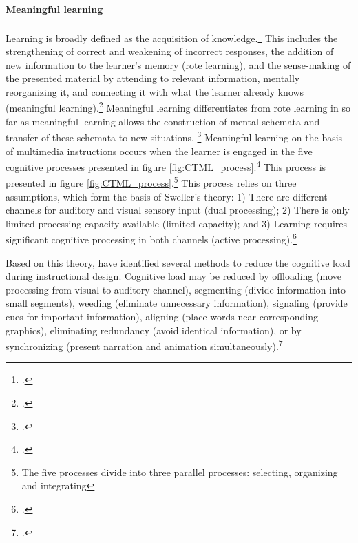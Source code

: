 \paragraph{Meaningful learning} Learning is broadly defined as the acquisition of knowledge.\footcites[Cf.][p.226]{MayerRotemeaningfullearning2002} This includes the strengthening of correct and weakening of incorrect responses, the addition of new information to the learner's memory (rote learning), and the sense-making of the presented material by attending to relevant information, mentally reorganizing it, and connecting it with what the learner already knows (meaningful learning).\footcites[Cf.][chapter 2, paragraph 5]{ClarkElearningscienceinstruction2016} Meaningful learning differentiates from rote learning in so far as meaningful learning allows the construction of mental schemata and transfer of these schemata to new situations.%
\footcites[Cf.][p.227]{MayerRotemeaningfullearning2002}[cf.][p.299]{SwellerCognitiveloadtheory1994} Meaningful learning on the basis of multimedia instructions occurs when the learner is engaged in the five cognitive processes presented in figure \ref{fig:CTML_process}.\footcites[Cf.][p.111]{MayerCognitiveTheoryMultimedia1999}[cf.][p.35]{SordenCognitiveTheoryMultimedia2012}[cf.][p.43]{MayerNineWaysReduce2003} This process is presented in figure \ref{fig:CTML_process}.\footnote{The five processes divide into three parallel processes: selecting, organizing and integrating} This process relies on three assumptions, which form the basis of Sweller's theory: 1) There are different channels for auditory and visual sensory input (dual processing); 2) There is only limited processing capacity available (limited capacity); and 3) Learning requires significant cognitive processing in both channels (active processing).\footcites[Cf.][p.44]{MayerNineWaysReduce2003}

Based on this theory, \cite{MayerNineWaysReduce2003} have identified several methods to reduce the cognitive load during instructional design. Cognitive load may be reduced by offloading (move processing from visual to auditory channel), segmenting (divide information into small segments), weeding (eliminate unnecessary information), signaling (provide cues for important information), aligning (place words near corresponding graphics), eliminating redundancy (avoid identical information), or by synchronizing (present narration and animation simultaneously).\footcites[Cf.][p.46]{MayerNineWaysReduce2003}

